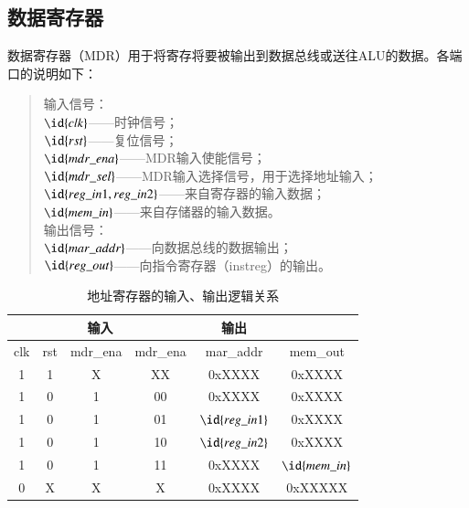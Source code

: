 \documentclass[titlepage, 11pt]{article}
\begin{document}
	\subsection{数据寄存器}
		数据寄存器（MDR）用于将寄存将要被输出到数据总线或送往ALU的数据。各端口的说明如下：
		\begin{quote}
		输入信号：\\
		$\id{clk}$——时钟信号；\\
		$\id{rst}$——复位信号；\\
		$\id{mdr\_ena}$——MDR输入使能信号；\\
		$\id{mdr\_sel}$——MDR输入选择信号，用于选择地址输入；\\
		$\id{reg\_in1,reg\_in2}$——来自寄存器的输入数据；\\
		$\id{mem\_in}$——来自存储器的输入数据。\\
		输出信号：\\
		$\id{mar\_addr}$——向数据总线的数据输出；\\
		$\id{reg\_out}$——向指令寄存器（instreg）的输出。
		\end{quote}
		\begin{table}[htb]
		\centering
		\caption{地址寄存器的输入、输出逻辑关系}
			\begin{tabular}{c|c|c|c|c|c}
			\multicolumn{4}{c|}{输入}         & 输出              \\ \hline
			clk & rst & mdr\_ena & mdr\_ena & mar\_addr&mem\_out       \\ \hline
			1   & 1   & X        & XX       & 0xXXXX&0xXXXX          \\ \hline
			1   & 0   & 1        & 00       & 0xXXXX&0xXXXX  \\ \hline
			1   & 0   & 1        & 01       & $\id{reg\_in1}$&0xXXXX \\ \hline
			1   & 0   & 1        & 10       & $\id{reg\_in2}$&0xXXXX \\ \hline
			1   & 0   & 1        & 11       & 0xXXXX&$\id{mem\_in}$       \\ \hline
			0   & X   & X        & X        & 0xXXXX&0xXXXXX        
			\end{tabular}
		\end{table}
\end{document}
